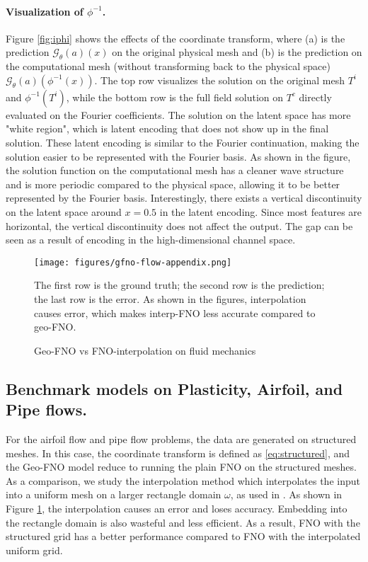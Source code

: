 \documentclass{article}
\newcommand{\G}{\mathcal{G}}
\begin{document}
\paragraph{Visualization of $\phi^{-1}$.} 
Figure \ref{fig:iphi} shows the effects of the coordinate transform, where (a) is the prediction $\G_\theta(a)(x)$ on the original physical mesh and (b) is the prediction on the computational mesh (without transforming back to the physical space) $\G_\theta(a)(\phi^{-1}(x))$. 
The top row visualizes the solution on the original mesh $T^i$ and $\phi^{-1}(T^i)$, while the bottom row is the full field solution on $T^c$ directly evaluated on the Fourier coefficients.
The solution on the latent space has more "white region", which is latent encoding that does not show up in the final solution. These latent encoding is similar to the Fourier continuation, making the solution easier to be represented with the Fourier basis.
As shown in the figure, the solution function on the computational mesh has a cleaner wave structure and is more periodic compared to the physical space, allowing it to be better represented by the Fourier basis.
Interestingly, there exists a vertical discontinuity on the latent space around $x=0.5$ in the latent encoding. Since most features are horizontal, the vertical discontinuity does not affect the output. The gap can be seen as a result of encoding in the high-dimensional channel space.

\begin{figure}
    \centering
    \texttt{[image: figures/gfno-flow-appendix.png]}
    \caption{Geo-FNO vs FNO-interpolation on fluid mechanics}
    \label{fig:flow-appendix}
    {\small  
    The first row is the ground truth; the second row is the prediction; the last row is the error. As shown in the figures, interpolation causes error, which makes interp-FNO less accurate compared to geo-FNO.} 
\end{figure}

\subsection{Benchmark models on Plasticity, Airfoil, and Pipe flows.}
For the airfoil flow and pipe flow problems, the data are generated on structured meshes. In this case, the coordinate transform is defined as \eqref{eq:structured}, and the Geo-FNO model reduce to running the plain FNO on the structured meshes. As a comparison, we study the interpolation method which interpolates the input into a uniform mesh on a larger rectangle domain $\omega$, as used in \citep{lu2021comprehensive}. As shown in Figure \ref{fig:flow-appendix}, the interpolation causes an error and loses accuracy. Embedding into the rectangle domain is also wasteful and less efficient. As a result, FNO with the structured grid has a better performance compared to FNO with the interpolated uniform grid.
\end{document}
